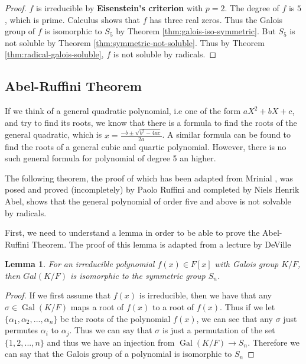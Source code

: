 \documentclass[12pt]{article}
\newtheorem{lemma}{Lemma}
\theoremstyle{definition}
\newcommand{\Gal}{\operatorname{Gal}}
\begin{document}
\begin{proof}
    $f$ is irreducible by \textbf{Eisenstein's criterion} with $p = 2$. The degree of $f$ is $5$, which is prime. Calculus shows that $f$ has three real zeros. Thus the Galois group of $f$ is isomorphic to $S_5$ by Theorem \ref{thm:galois-iso-symmetric}. But $S_5$ is not soluble by Theorem \ref{thm:symmetric-not-soluble}. Thus by Theorem \ref{thm:radical-galois-soluble}, $f$ is not soluble by radicals.
\end{proof}

\subsection{Abel-Ruffini Theorem}

If we think of a general quadratic polynomial, i.e one of the form $aX^2+bX+c$, and try to find its roots, we know that there is a formula to find the roots of the general quadratic, which is $x = \frac{-b \pm \sqrt{b^2 - 4ac}}{2a}$. A similar formula can be found to find the roots of a general cubic and quartic polynomial. However, there is no such general formula for polynomial of degree 5 an higher.

The following theorem, the proof of which has been adapted from Mrinial \cite{Abel-Ruffini}, was posed and proved (incompletely) by Paolo Ruffini and completed by Niels Henrik Abel, shows that the general polynomial of order five and above is not solvable by radicals.

First, we need to understand a lemma in order to be able to prove the Abel-Ruffini Theorem. The proof of this lemma is adapted from a lecture by DeVille \cite{galois-lecture-polynomials}

\begin{lemma}\label{lemma:galois-symmetric}
    For an irreducible polynomial $f(x) \in F[x]$ with Galois group $K/F$, then $Gal(K/F)$ is isomorphic to the symmetric group $S_n$.
\end{lemma}

\begin{proof}
    If we first assume that $f(x)$ is irreducible, then we have that any $\sigma \in \Gal(K/F)$ maps a root of $f(x)$ to a root of $f(x)$. Thus if we let $\{\alpha_1,\alpha_2,...,\alpha_n\}$ be the roots of the polynomial $f(x)$, we can see that any $\sigma$ just permutes $\alpha_i$ to $\alpha_j$. Thus we can say that $\sigma$ is just a permutation of the set $\{1,2,...,n\}$ and thus we have an injection from $\Gal(K/F) \to S_n$. Therefore we can say that the Galois group of a polynomial is isomorphic to $S_n$
\end{proof}
\end{document}
